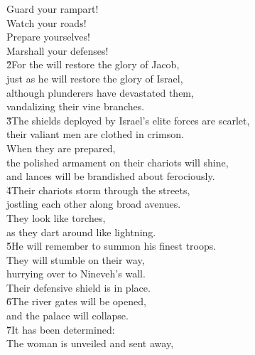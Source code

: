\begin{poetry}
\poeml Guard your rampart! \\
\poemlll       Watch your roads! \\
\poeml Prepare yourselves! \\
\poemll    Marshall your defenses! \\
\poeml \v{2}For the  will restore the glory of Jacob, \\
\poemll    just as he will restore the glory of Israel, \\
\poeml although plunderers have devastated them, \\
\poemll    vandalizing their vine branches. \\
\poeml \v{3}The shields deployed by Israel's elite forces are scarlet, \\
\poemll    their valiant men are clothed in crimson. \\
\poeml When they are prepared, \\
\poemll    the polished armament on their chariots will shine, \\
\poemlll       and lances will be brandished about ferociously. \\
\poeml \v{4}Their chariots storm through the streets, \\
\poemll    jostling each other along broad avenues. \\
\poeml They look like torches, \\
\poemll    as they dart around like lightning. \\
\poeml \v{5}He will remember to summon his finest troops. \\
\poemll    They will stumble on their way, \\
\poemlll       hurrying over to Nineveh's wall. \\
\poeml Their defensive shield is in place. \\
\poeml \v{6}The river gates will be opened, \\
\poemll    and the palace will collapse. \\
\poeml \v{7}It has been determined: \\
\poemll    The woman is unveiled and sent away, \\

\end{poetry}
